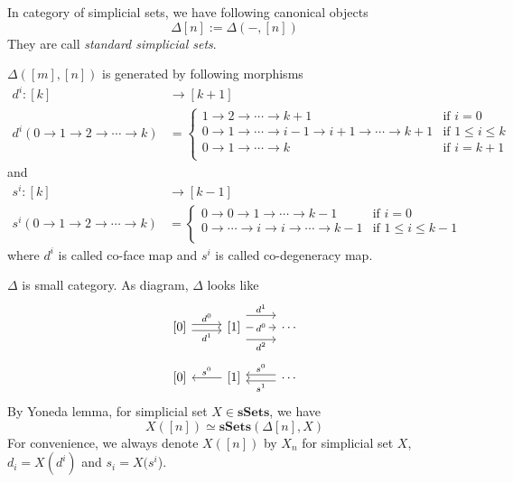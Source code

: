 \documentclass[b5paper,10pt]{article}
\begin{document}
	In category of simplicial sets, we have following canonical objects
	\[
	\Delta[n] := \Delta(-,[n])
	\]
	They are call \emph{standard simplicial sets}.
	\begin{secprop}
		$\Delta([m],[n])$ is generated by following morphisms
		\[
		\begin{aligned}
			d^i \colon [k] &\to [k+1]\\
			d^i(0 \to 1 \to 2 \to \cdots \to k)&=\begin{cases}
			1\to 2 \to \cdots \to k+1& \text{if } i =0\\
			0 \to 1 \to \cdots \to i-1 \to i+1 \to \cdots \to k+1& \text{if } 1\leq i \leq k\\
			0 \to 1 \to \cdots \to k& \text{if } i =k+1\\
			\end{cases}
		\end{aligned} 
		\]
		and
		\[
		\begin{aligned}
		s^i \colon [k] &\to [k-1]\\
		s^i(0 \to 1 \to 2 \to \cdots \to k)&=\begin{cases}
		0\to 0 \to 1 \to \cdots \to k-1& \text{if } i =0\\
		0 \to \cdots \to i \to i  \to \cdots \to k-1& \text{if } 1\leq i \leq k-1\\
		\end{cases}
		\end{aligned} 
		\]
		where $d^i$ is called co-face map and $s^i$ is called co-degeneracy map.
	\end{secprop}
$\Delta$ is small category. As diagram, $\Delta$ looks like
\[
\begin{tikzcd} 
 {[0]} \arrow[r, shift left,"d^0"] \arrow[r, shift right,"d^1"'] & {[1]} \arrow[r,"d^0" description] \arrow[r, shift left=4,"d^1"] \arrow[r, shift right=4,"d^2"'] & \cdots 
\end{tikzcd}
\]
\[
\begin{tikzcd} 
{[0]} \arrow[r,"s^0",leftarrow] & {[1]} \arrow[r,shift left,"s^0",leftarrow] \arrow[r, shift right,"s^1"',leftarrow]  & \cdots 
\end{tikzcd}
\]
By Yoneda lemma, for simplicial set $X \in \mathbf{sSets}$, we have 
\[
X([n])\simeq \mathbf{sSets}(\Delta[n], X)
\]
For convenience, we always denote $X([n])$ by $X_n$ for simplicial set $X$, $d_i = X(d^i)$ and $s_i= X(s^i$). 
\end{document}
